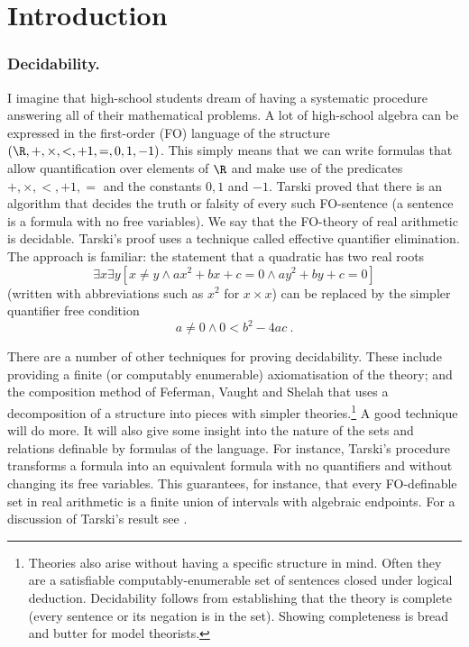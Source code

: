 \section{Introduction} \label{AS:sec:introduction}

\subsubsection{Decidability.}
I imagine that high-school students dream of having a systematic procedure
answering all of their mathematical problems. A lot of high-school algebra can be
expressed in the first-order (FO) language of the structure
$(\R,+,\times,<,+1,=,0,1,-1)$. This simply means
that we can write formulas that allow quantification over elements of $\R$ and
make use of the predicates $+, \times, < ,+1, =$ and the constants $0,1$ and $-1$.
Tarski proved that there is an algorithm that decides the truth or falsity of
every such FO-sentence (a sentence is a formula with no free variables). We say
that the FO-theory of real arithmetic is decidable. Tarski's proof uses a
technique called effective quantifier elimination. The approach is familiar:
the statement that a quadratic has two real roots
\[
\exists x \exists y [x \neq y \wedge ax^2 + bx + c = 0 \wedge ay^2 + by + c =0]
\]
(written with abbreviations such as $x^2$ for $x \times x$) 
can be replaced by the simpler quantifier free condition
\[
a \neq 0 \wedge 0 < b^2 - 4ac \ .
\]

There are a number of other techniques for proving decidability. These include
providing a finite (or computably enumerable) axiomatisation of the theory; and  the composition method
of Feferman, Vaught and Shelah that uses a decomposition of a structure into pieces with simpler theories.\footnote{Theories also arise without having a specific structure in mind. Often they are a satisfiable computably-enumerable set of sentences closed under logical deduction. Decidability follows from establishing that the theory is complete (every sentence or its negation is in the set). Showing completeness is bread and butter for model theorists.}
A good technique will do more. It will
also give some insight into the nature of the sets and relations definable by
formulas of the language.  For instance, Tarski's procedure transforms a
formula into an equivalent formula with no quantifiers and without changing its
free variables.  This guarantees, for instance, that every FO-definable set in real arithmetic is
a finite union of intervals with algebraic endpoints. For a discussion of Tarski's
result see \cite{Drie88}. 


